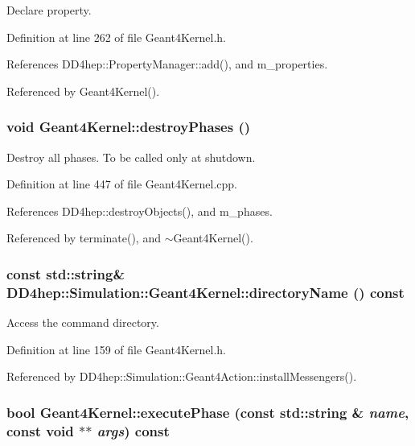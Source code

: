 Declare property. 

Definition at line 262 of file Geant4Kernel.h.

References DD4hep::PropertyManager::add(), and m\_\-properties.

Referenced by Geant4Kernel().\hypertarget{class_d_d4hep_1_1_simulation_1_1_geant4_kernel_af8c01fc03cdb8db95fafe071eee0ba5a}{
\subsubsection[{destroyPhases}]{\setlength{\rightskip}{0pt plus 5cm}void Geant4Kernel::destroyPhases ()}}
\label{class_d_d4hep_1_1_simulation_1_1_geant4_kernel_af8c01fc03cdb8db95fafe071eee0ba5a}


Destroy all phases. To be called only at shutdown. 

Definition at line 447 of file Geant4Kernel.cpp.

References DD4hep::destroyObjects(), and m\_\-phases.

Referenced by terminate(), and $\sim$Geant4Kernel().\hypertarget{class_d_d4hep_1_1_simulation_1_1_geant4_kernel_aa30888e16596794250fb32e545ff78bb}{
\subsubsection[{directoryName}]{\setlength{\rightskip}{0pt plus 5cm}const std::string\& DD4hep::Simulation::Geant4Kernel::directoryName () const}}
\label{class_d_d4hep_1_1_simulation_1_1_geant4_kernel_aa30888e16596794250fb32e545ff78bb}


Access the command directory. 

Definition at line 159 of file Geant4Kernel.h.

Referenced by DD4hep::Simulation::Geant4Action::installMessengers().\hypertarget{class_d_d4hep_1_1_simulation_1_1_geant4_kernel_a9fbb49abf09139f19d21a5d5d83f2590}{
\subsubsection[{executePhase}]{\setlength{\rightskip}{0pt plus 5cm}bool Geant4Kernel::executePhase (const std::string \& {\em name}, \/  const void $\ast$$\ast$ {\em args}) const}}
\label{class_d_d4hep_1_1_simulation_1_1_geant4_kernel_a9fbb49abf09139f19d21a5d5d83f2590}


